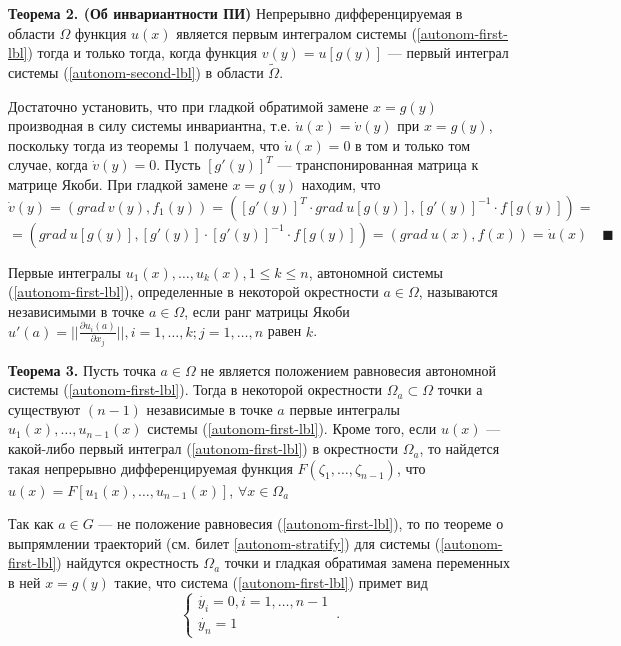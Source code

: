 \par \textbf{Теорема 2. (Об инвариантности ПИ)} Непрерывно дифференцируемая в области $\Omega$ функция $u(x)$
является первым интегралом системы (\ref{autonom-first-lbl}) тогда и только тогда, когда
функция $v(y) = u[g(y)]$ — первый интеграл системы (\ref{autonom-second-lbl}) в области $\tilde{\Omega}$.
\par \Proof Достаточно установить, что при гладкой обратимой замене $x=g(y)$ производная в силу системы инвариантна, т.е. $\dot{u}(x)=\dot{v}(y)$ при $x = g(y)$,
поскольку тогда из теоремы 1 получаем, что $\dot{u}(x) = 0$ в том и только
том случае, когда $\dot{v}(y) = 0$. Пусть $[g'(y)]^T$ — транспонированная матрица
к матрице Якоби. При гладкой замене $x= g(y)$ находим, что
$$\dot{v}(y) = (grad \: v (y ), f_1(y )) = ( [g'(y)]^T \cdot grad \: u [g(y)], [g'(y)]^{-1} \cdot f[g(y)]) =$$
$$= (grad \: u [g(y)], [g'(y)] \cdot [g'(y)]^{-1} \cdot f[g(y)]) = (grad \: u(x),f(x)) = \dot{u}(x) \quad \blacksquare$$

\par \Def Первые интегралы $u_1(x), \ldots, u_k(x), 1 \leq k \leq n$, автономной системы (\ref{autonom-first-lbl}), определенные в некоторой окрестности $a \in \Omega$, называются независимыми в точке $a \in \Omega$, если ранг матрицы Якоби $u'(a)=||\frac{\partial u_i(a)}{\partial x_j}||, i=1, \ldots, k; j = 1, \ldots, n$ равен $k$.

\par \textbf{Теорема 3.} Пусть точка $a \in \Omega$ не является положением равновесия автономной системы (\ref{autonom-first-lbl}). Тогда в некоторой окрестности $\Omega_a \subset \Omega$ точки а существуют $(n- 1)$ независимые в точке $a$ первые интегралы $u_1(x), \ldots, u_{n-1}(x)$ системы (\ref{autonom-first-lbl}). Кроме того, если $u(x)$ — какой-либо первый интеграл (\ref{autonom-first-lbl}) в окрестности $\Omega_a$, то найдется такая непрерывно дифференцируемая функция $F(\zeta_1, \ldots, \zeta_{n-1})$, что $u(x)=F[u_1(x), \ldots, u_{n-1}(x)]$, $\forall x \in \Omega_a$

\par \Proof Так как $a\in G$ — не положение равновесия (\ref{autonom-first-lbl}), то по теореме о выпрямлении траекторий (см. билет \ref{autonom-stratify}) для системы (\ref{autonom-first-lbl}) найдутся окрестность $\Omega_a$ точки и гладкая обратимая замена переменных в ней $x=g(y)$ такие, что система (\ref{autonom-first-lbl}) примет вид
\begin{equation}\label{autonom-third-lbl}
    \begin{cases}
      \dot{y_i}=0, i = 1, \ldots, n-1\\
      \dot{y_n}=1
    \end{cases}\,.
\end{equation}


